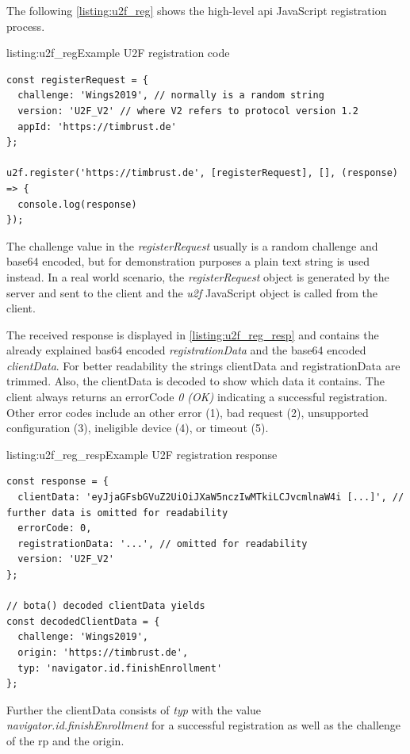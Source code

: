 The following \autoref{listing:u2f_reg} shows the high-level \gls{api} JavaScript registration process.
\\
\begin{example}{listing:u2f_reg}{Example U2F registration code}
\begin{verbatim}
const registerRequest = {
  challenge: 'Wings2019', // normally is a random string
  version: 'U2F_V2' // where V2 refers to protocol version 1.2
  appId: 'https://timbrust.de'
};

u2f.register('https://timbrust.de', [registerRequest], [], (response) => {
  console.log(response)
});
\end{verbatim}
\end{example}

The challenge value in the \textit{registerRequest} usually is a random challenge and base64 encoded, but for demonstration purposes a plain text string is used instead. In a real world scenario, the \textit{registerRequest} object is generated by the server and sent to the client and the \textit{u2f} JavaScript object is called from the client.

The received response is displayed in \autoref{listing:u2f_reg_resp} and contains the already explained bas64 encoded \textit{registrationData} and the base64 encoded \textit{clientData}. For better readability the strings clientData and registrationData are trimmed. Also, the clientData is decoded to show which data it contains. The client always returns an errorCode \textit{0 (OK)} indicating a successful registration. Other error codes include an other error (1), bad request (2), unsupported configuration (3), ineligible device (4), or timeout (5).

\begin{example}{listing:u2f_reg_resp}{Example U2F registration response}
\begin{verbatim}
const response = {
  clientData: 'eyJjaGFsbGVuZ2UiOiJXaW5nczIwMTkiLCJvcmlnaW4i [...]', // further data is omitted for readability
  errorCode: 0,
  registrationData: '...', // omitted for readability
  version: 'U2F_V2'
};

// bota() decoded clientData yields
const decodedClientData = {
  challenge: 'Wings2019',
  origin: 'https://timbrust.de',
  typ: 'navigator.id.finishEnrollment'
};
\end{verbatim}
\end{example}

Further the clientData consists of \textit{typ} with the value \textit{navigator.id.finishEnrollment} for a successful registration as well as the challenge of the \gls{rp} and the origin.

